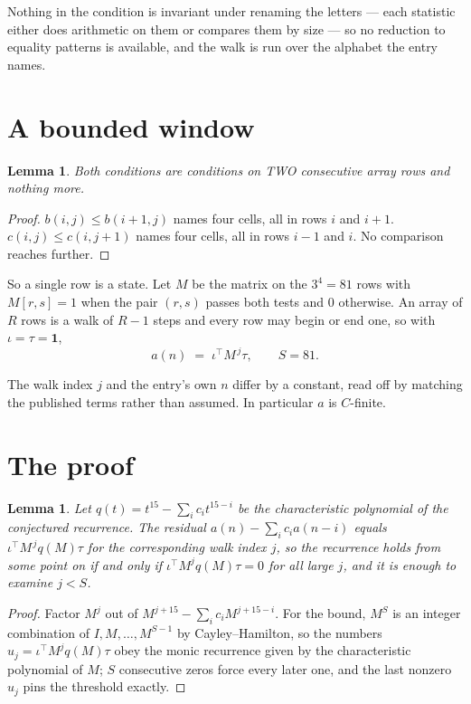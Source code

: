 \documentclass[11pt,a4paper]{article}
\theoremstyle{plain}
\newtheorem{lemma}[theorem]{Lemma}
\theoremstyle{definition}
\begin{document}
Nothing in the condition is invariant under renaming the letters --- each statistic either does
arithmetic on them or compares them by size --- so no reduction to equality patterns is
available, and the walk is run over the alphabet the entry names.

\section{A bounded window}

\begin{lemma}\label{lem:win}
Both conditions are conditions on TWO consecutive array rows and nothing more.
\end{lemma}

\begin{proof}
$b(i,j)\le b(i{+}1,j)$ names four cells, all in rows $i$ and $i+1$. $c(i,j)\le c(i,j{+}1)$
names four cells, all in rows $i-1$ and $i$. No comparison reaches further.
\end{proof}

So a single row is a state. Let $M$ be the matrix on the $3^{4}=81$ rows with
$M[r,s]=1$ when the pair $(r,s)$ passes both tests and $0$ otherwise. An array of $R$ rows is a
walk of $R-1$ steps and every row may begin or end one, so with $\iota=\tau=\mathbf{1}$,
\[
a(n)\;=\;\iota^{\!\top}M^{\,j}\tau ,\qquad S=81.
\]

The walk index $j$ and the entry's own $n$ differ by a constant, read off by matching the
published terms rather than assumed. In particular $a$ is $C$-finite.

\section{The proof}

\begin{lemma}\label{lem:crit}
Let $q(t)=t^{15}-\sum_i c_it^{15-i}$ be the characteristic polynomial of the
conjectured recurrence. The residual $a(n)-\sum_ic_ia(n-i)$ equals
$\iota^{\!\top}M^{\,j}q(M)\tau$ for the corresponding walk index $j$, so the recurrence
holds from some point on if and only if $\iota^{\!\top}M^{j}q(M)\tau=0$ for all large $j$,
and it is enough to examine $j<S$.
\end{lemma}

\begin{proof}
Factor $M^{j}$ out of $M^{j+15}-\sum_ic_iM^{j+15-i}$. For the bound, $M^{S}$
is an integer combination of $I,M,\dots,M^{S-1}$ by Cayley--Hamilton, so the numbers
$u_j=\iota^{\!\top}M^{j}q(M)\tau$ obey the monic recurrence given by the characteristic
polynomial of $M$; $S$ consecutive zeros force every later one, and the last nonzero $u_j$
pins the threshold exactly.
\end{proof}
\end{document}
